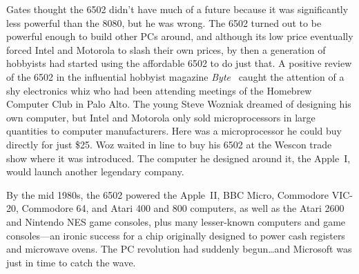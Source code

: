 Gates thought the 6502 didn't have much of a future because it was
significantly less powerful than the 8080, but he was wrong.
The 6502 turned out to be powerful enough to build other PCs around,
and although its low price eventually forced Intel and Motorola to
slash their own prices, by then a generation of hobbyists had started
using the affordable 6502 to do just that.
A positive review of the 6502 in the influential hobbyist magazine
\emph{Byte}~\cite{byte75:6502} caught the attention of a shy
electronics whiz who had been attending meetings of the Homebrew
Computer Club in Palo Alto.
The young Steve Wozniak dreamed of designing his own computer,
but Intel and Motorola only sold microprocessors in large quantities
to computer manufacturers.
Here was a microprocessor he could buy directly for just \$25.
Woz waited in line to buy his 6502 at the Wescon trade show where it was
introduced.  The computer he designed around it, the Apple~I,
would launch another legendary company.

By the mid 1980s, the 6502 powered the
Apple~II, BBC Micro, Commodore VIC-20, Commodore 64, and Atari 400 and
800 computers, as well as the Atari 2600 and Nintendo NES game
consoles, plus many lesser-known computers and game consoles---an
ironic success for a chip originally designed to power cash registers
and microwave ovens.
The PC revolution had suddenly begun\ldots{}and Microsoft was just in
time to catch the wave.


